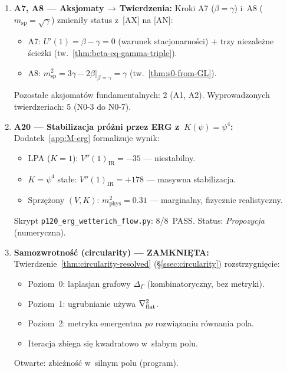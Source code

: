 \begin{enumerate}
  \item \textbf{A7, A8 --- Aksjomaty\,$\to$\,Twierdzenia:}
    Kroki A7 ($\beta = \gamma$) i~A8 ($m_{\mathrm{sp}} = \sqrt{\gamma}$)
    zmieni\l{}y status z~[AX] na [AN]:
    \begin{itemize}[nosep]
      \item A7: $U'(1) = \beta - \gamma = 0$ (warunek stacjonarno\'sci)
        $+$ trzy niezale\.zne \'scie\.zki
        (tw.~\ref{thm:beta-eq-gamma-triple}).
      \item A8: $m_{\mathrm{sp}}^2 = 3\gamma - 2\beta\big|_{\beta=\gamma} = \gamma$
        (tw.~\ref{thm:s0-from-GL}).
    \end{itemize}
    Pozosta\l{}e aksjomat\'ow fundamentalnych: 2 (A1, A2).
    Wyprowadzonych twierdzeriach: 5 (N0-3 do N0-7).

  \item \textbf{A20 --- Stabilizacja pr\'o\.zni przez ERG
    z~$K(\psi)=\psi^4$:}
    Dodatek~\ref{app:M-erg} formalizuje wynik:
    \begin{itemize}[nosep]
      \item LPA ($K=1$): $V''(1)_{\mathrm{IR}} = -35$ --- niestabilny.
      \item $K=\psi^4$ sta\l{}e: $V''(1)_{\mathrm{IR}} = +178$
            --- masywna stabilizacja.
      \item Sprz\k{e}\.zony $(V,K)$: $m^2_{\mathrm{phys}} = 0.31$
            --- marginalny, fizycznie realistyczny.
    \end{itemize}
    Skrypt \texttt{p120\_erg\_wetterich\_flow.py}: 8/8~PASS.
    Status: \emph{Propozycja} (numeryczna).

  \item \textbf{Samozwrotno\'s\'c (circularity) --- ZAMKNI\k{E}TA:}
    Twierdzenie~\ref{thm:circularity-resolved}
    (\S\ref{ssec:circularity}) rozstrzygni\k{e}cie:
    \begin{itemize}[nosep]
      \item Poziom~0: laplasjan grafowy $\Delta_\Gamma$
            (kombinatoryczny, bez metryki).
      \item Poziom~1: ugrubnianie u\.zywa $\nabla^2_{\rm flat}$.
      \item Poziom~2: metryka emergentna \emph{po} rozwi\k{a}zaniu
            r\'ownania pola.
      \item Iteracja zbiega si\k{e} kwadratowo w~s\l{}abym polu.
    \end{itemize}
    Otwarte: zbie\.zno\'s\'c w~silnym polu (program).
\end{enumerate}

